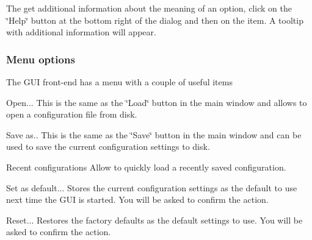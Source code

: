  The get additional information about the meaning of an option, click on the \char`\"{}Help\char`\"{} button at the bottom right of the dialog and then on the item. A tooltip with additional information will appear.

\subsubsection*{Menu options}

The GUI front-\/end has a menu with a couple of useful items

 
\begin{DoxyDescription}
\item[Open...]This is the same as the \char`\"{}Load\char`\"{} button in the main window and allows to open a configuration file from disk. 
\item[Save as..]This is the same as the \char`\"{}Save\char`\"{} button in the main window and can be used to save the current configuration settings to disk. 
\item[Recent configurations]Allow to quickly load a recently saved configuration. 
\item[Set as default...]Stores the current configuration settings as the default to use next time the GUI is started. You will be asked to confirm the action. 
\item[Reset...]Restores the factory defaults as the default settings to use. You will be asked to confirm the action. 
\end{DoxyDescription}